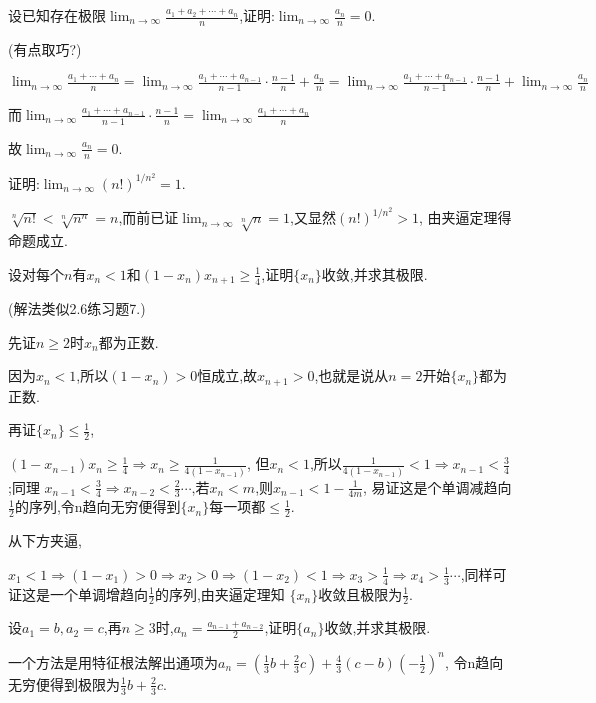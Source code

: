 \documentclass{exam}
\begin{document}
\begin{questions}
    \question
    设已知存在极限$\lim_{n\to\infty}\frac{a_1+a_2+\cdots+a_n}{n}$,证明:$\lim_{n\to\infty}\frac{a_n}{n}=0$.
    \begin{solution}
        (有点取巧?)

        $\lim_{n\to\infty}\frac{a_1+\cdots+a_n}{n}=
        \lim_{n\to\infty}\frac{a_1+\cdots+a_{n-1}}{n-1}\cdot\frac{n-1}{n}+\frac{a_n}{n}=
        \lim_{n\to\infty}\frac{a_1+\cdots+a_{n-1}}{n-1}\cdot\frac{n-1}{n}+\lim_{n\to\infty}\frac{a_n}{n}$

        而$\lim_{n\to\infty}\frac{a_1+\cdots+a_{n-1}}{n-1}\cdot\frac{n-1}{n}=\lim_{n\to\infty}\frac{a_1+\cdots+a_n}{n}$

        故$\lim_{n\to\infty}\frac{a_n}{n}=0$.
    \end{solution}

    \question
    证明:$\lim_{n\to\infty}(n!)^{1/n^2}=1$.
    \begin{solution}
        $\sqrt[n]{n!}<\sqrt[n]{n^n}=n$,而前已证$\lim_{n\to\infty}\sqrt[n]{n}=1$,又显然$(n!)^{1/n^2}>1$,
        由夹逼定理得命题成立.
    \end{solution}

    \question
    设对每个$n$有$x_n<1$和$(1-x_n)x_{n+1}\geqslant\frac{1}{4}$,证明$\{x_n\}$收敛,并求其极限.
    \begin{solution}
        (解法类似2.6练习题7.)
        
        先证$n\geqslant2$时$x_n$都为正数.

        因为$x_n<1$,所以$(1-x_n)>0$恒成立,故$x_{n+1}>0$,也就是说从$n=2$开始$\{x_n\}$都为正数.

        再证$\{x_n\}\leqslant\frac{1}{2}$,

        $(1-x_{n-1})x_n\geqslant\frac{1}{4}\Rightarrow x_n\geqslant\frac{1}{4(1-x_{n-1})}$,
        但$x_n<1$,所以$\frac{1}{4(1-x_{n-1})}<1\Rightarrow x_{n-1}<\frac{3}{4}$;同理
        $x_{n-1}<\frac{3}{4}\Rightarrow x_{n-2}<\frac{2}{3}\cdots$,若$x_n<m$,则$x_{n-1}<1-\frac{1}{4m}$,
        易证这是个单调减趋向$\frac{1}{2}$的序列,令n趋向无穷便得到$\{x_n\}$每一项都$\leqslant\frac{1}{2}$.

        从下方夹逼,
        
        $x_1<1\Rightarrow(1-x_1)>0\Rightarrow x_2>0\Rightarrow(1-x_2)<1\Rightarrow x_3>\frac{1}{4}
        \Rightarrow x_4>\frac{1}{3}\cdots$,同样可证这是一个单调增趋向$\frac{1}{2}$的序列,由夹逼定理知
        $\{x_n\}$收敛且极限为$\frac{1}{2}$.
    \end{solution}

    \question
    设$a_1=b,a_2=c$,再$n\geqslant3$时,$a_n=\frac{a_{n-1}+a_{n-2}}{2}$,证明$\{a_n\}$收敛,并求其极限.
    \begin{solution}
        一个方法是用特征根法解出通项为$a_n=(\frac{1}{3}b+\frac{2}{3}c)+\frac{4}{3}(c-b)(-\frac{1}{2})^n$,
        令n趋向无穷便得到极限为$\frac{1}{3}b+\frac{2}{3}c$.


\end{solution}
\end{questions}
\end{document}
